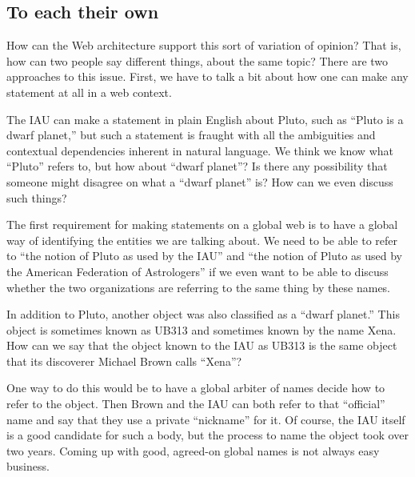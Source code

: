 \subsection{To each their own}

How can the Web architecture support this sort of variation of opinion?
That is, how can two people say different things, about the same topic?
There are two approaches to this issue. First, we have to talk a bit
about how one can make any statement at all in a web context.

The IAU can make a statement in plain English about Pluto, such as
``Pluto is a dwarf planet,'' but such a statement is fraught with all
the ambiguities and contextual dependencies inherent in natural
language. We think we know what ``Pluto'' refers to, but how about
``dwarf planet''? Is there any possibility that someone might disagree
on what a ``dwarf planet'' is? How can we even discuss such things?

The first requirement for making statements on a global web is to have a
global way of identifying the entities we are talking about. We need to
be able to refer to ``the notion of Pluto as used by the IAU'' and ``the
notion of Pluto as used by the American Federation of Astrologers'' if
we even want to be able to discuss whether the two organizations are
referring to the same thing by these names.

In addition to Pluto, another object was also classified as a ``dwarf
planet.'' This object is sometimes known as UB313 and sometimes known by
the name Xena. How can we say that the object known to the IAU as UB313
is the same object that its discoverer Michael Brown calls ``Xena''?

One way to do this would be to have a global arbiter of names decide how
to refer to the object. Then Brown and the IAU can both refer to that
``official'' name and say that they use a private ``nickname'' for it.
Of course, the IAU itself is a good candidate for such a body, but the
process to name the object took over two years. Coming up with good,
agreed-on global names is not always easy business.

